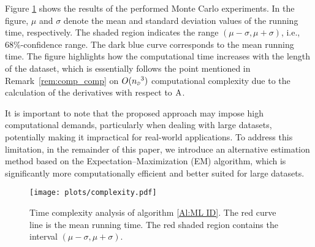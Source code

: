 Figure \ref{img:time complexity} shows the results of the performed Monte Carlo experiments. In the figure, $\mu$ and $\sigma$ denote the mean and standard deviation values of the running time, respectively. The shaded region indicates the range $(\mu -\sigma, \mu + \sigma)$, i.e., 68\%-confidence range. The dark blue curve corresponds to the mean running time. The figure highlights how the computational time increases with the length of the dataset, which is essentially follows the point mentioned in Remark~\ref{rem:comp_comp} on $O(\nD^3)$ computational complexity due to the calculation of the derivatives with respect to ${ \mathrm{A} }$.
%


It is important to note that the proposed approach may impose high computational demands, particularly when dealing with large datasets, potentially making it impractical for real-world applications. To address this limitation, in the remainder of this paper, we introduce an alternative estimation method based on the Expectation--Maximization (EM) algorithm, which is significantly more computationally efficient and better suited for large datasets.


\begin{figure}[t!]
   \centering
   \texttt{[image: plots/complexity.pdf]}
   \caption{Time complexity analysis of algorithm \ref{Al:ML ID}. The red curve line is the mean running time. The red shaded region contains the interval $(\mu - \sigma, \mu + \sigma)$.}
   \label{img:time complexity}
\end{figure}